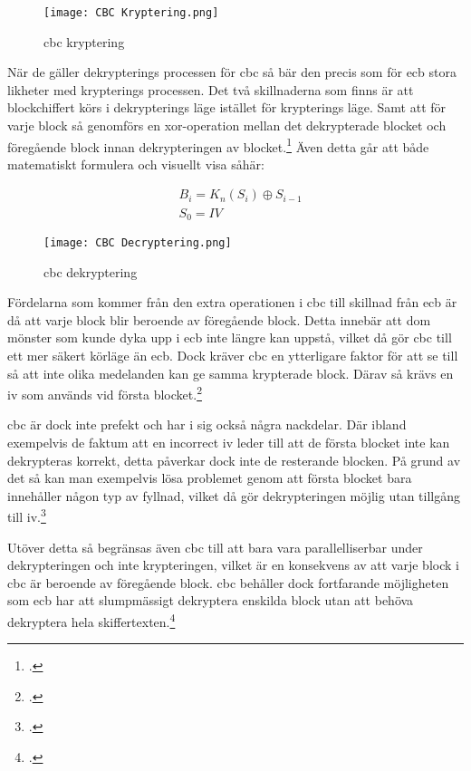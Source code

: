 \begin{figure}[H]
    \texttt{[image: CBC Kryptering.png]}
    \caption{\acrlong{cbc} kryptering}
    \label{fig:cbc-mode-enc}
\end{figure}

När de gäller dekrypterings processen för \acrshort{cbc} så bär den precis som för
\acrshort{ecb} stora likheter med krypterings processen. Det två skillnaderna som
finns är att blockchiffert körs i dekrypterings läge istället för krypterings läge.
Samt att för varje block så genomförs en \gls{xor}-operation mellan det dekrypterade
blocket och föregående block innan dekrypteringen av blocket.\footcite{dworkin2001sp}
Även detta går att både matematiskt formulera och visuellt visa såhär:

\begin{equation}
    \label{eq:cbc-decryption}
    \begin{aligned}
        &B_i = K_n(S_i) \oplus S_{i-1}\\\nonumber
        &S_0 = IV
    \end{aligned}
\end{equation}

\begin{figure}[H]
    \texttt{[image: CBC Decryptering.png]}
    \caption{\acrlong{cbc} dekryptering}
    \label{fig:cbc-mode-dec}
\end{figure}

Fördelarna som kommer från den extra operationen i \acrshort{cbc} till skillnad
från \acrshort{ecb} är då att varje block blir beroende av föregående block.
Detta innebär att dom mönster som kunde dyka upp i \acrshort{ecb} inte längre
kan uppstå, vilket då gör \acrshort{cbc} till ett mer säkert körläge än \acrshort{ecb}.
Dock kräver \acrshort{cbc} en ytterligare faktor för att se till så att inte olika medelanden
kan ge samma krypterade block. Därav så krävs en \acrfull{iv} som används vid första
blocket.\footcite{dworkin2001sp}

\acrshort{cbc} är dock inte prefekt och har i sig också några nackdelar. Där ibland
exempelvis de faktum att en incorrect \acrshort{iv} leder till att de första blocket
inte kan dekrypteras korrekt, detta påverkar dock inte de resterande blocken. På grund
av det så kan man exempelvis lösa problemet genom att första blocket bara innehåller
någon typ av fyllnad, vilket då gör dekrypteringen möjlig utan tillgång till \acrshort{iv}.\footcite{dworkin2001sp}

Utöver detta så begränsas även \acrshort{cbc} till att bara vara parallelliserbar under
dekrypteringen och inte krypteringen, vilket är en konsekvens av att varje block i \acrshort{cbc}
är beroende av föregående block. \acrshort{cbc} behåller dock fortfarande möjligheten
som \acrshort{ecb} har att slumpmässigt dekryptera enskilda block utan att behöva
dekryptera hela skiffertexten.\footcite{dworkin2001sp}

